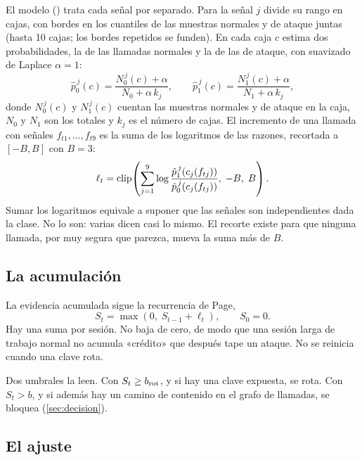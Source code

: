 El modelo () trata cada señal por separado. Para la señal $j$ divide su
rango en cajas, con bordes en los cuantiles de las muestras normales y de ataque juntas (hasta 10
cajas; los bordes repetidos se funden). En cada caja $c$ estima dos probabilidades, la de las llamadas
normales y la de las de ataque, con suavizado de Laplace $\alpha = 1$:
\begin{equation}
  \hat p_0^{\,j}(c) = \frac{N_0^{\,j}(c) + \alpha}{N_0 + \alpha\, k_j} , \qquad
  \hat p_1^{\,j}(c) = \frac{N_1^{\,j}(c) + \alpha}{N_1 + \alpha\, k_j} ,
  \label{eq:hist}
\end{equation}
donde $N_0^{\,j}(c)$ y $N_1^{\,j}(c)$ cuentan las muestras normales y de ataque en la caja, $N_0$ y
$N_1$ son los totales y $k_j$ es el número de cajas. El incremento de una llamada con señales
$f_{t1}, \dots, f_{t9}$ es la suma de los logaritmos de las razones, recortada a $[-B, B]$ con
$B = 3$:
\begin{equation}
  \ell_t = \operatorname{clip}\!\left( \sum_{j=1}^{9} \log \frac{\hat p_1^{\,j}\!\left(c_j(f_{tj})\right)}
                                               {\hat p_0^{\,j}\!\left(c_j(f_{tj})\right)} ,\; -B ,\; B \right) .
  \label{eq:ell}
\end{equation}
Sumar los logaritmos equivale a suponer que las señales son independientes dada la clase. No lo son:
varias dicen casi lo mismo. El recorte existe para que ninguna llamada, por muy segura que parezca,
mueva la suma más de $B$.

\subsection{La acumulación}

La evidencia acumulada sigue la recurrencia de Page,
\begin{equation}
  S_t = \max\!\left(0,\; S_{t-1} + \ell_t\right) , \qquad S_0 = 0 .
  \label{eq:cusum}
\end{equation}
Hay una suma por sesión. No baja de cero, de modo que una sesión larga de trabajo normal no acumula
«crédito» que después tape un ataque. No se reinicia cuando una clave rota.

Dos umbrales la leen. Con $S_t \geq b_{\mathrm{rot}}$, y si hay una clave expuesta, se rota. Con $S_t > b$, y si
además hay un camino de contenido en el grafo de llamadas, se bloquea (\cref{sec:decision}).

\subsection{El ajuste}\label{sec:modelo-ajustado}

